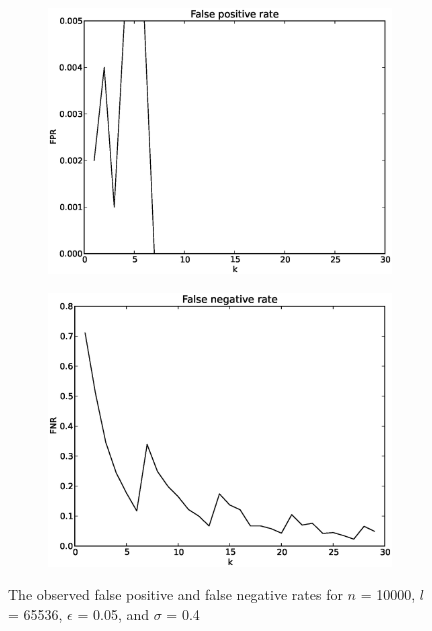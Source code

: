 \documentclass[a4paper,11pt]{article}
\begin{document}
\begin{figure}[H]
\centering
\begin{subfigure}{.5\textwidth}
  \centering
  \includegraphics[width=.95\linewidth]{FPR2}
\end{subfigure}%
\begin{subfigure}{.5\textwidth}
  \centering
  \includegraphics[width=.95\linewidth]{FNR2}
\end{subfigure}
\caption{The observed false positive and false negative rates for $n$ = 10000, $l$ = 65536, $\epsilon$ = 0.05, and $\sigma$ = 0.4}
\label{fig:n10000}
\end{figure}

\end{document}
